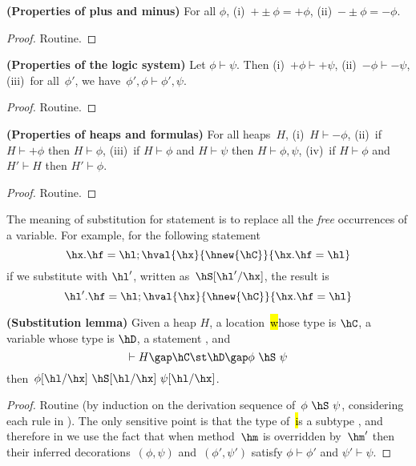 \begin{lemma}  \textbf{(Properties of plus and minus)}
\label{Lemma:plus}
For all $\phi$,
    (i)~$+\pm\phi=+\phi$,
    (ii)~$-\pm\phi=-\phi$.
\end{lemma}
\begin{proof}
Routine.
\end{proof}



\begin{lemma}   \textbf{(Properties of the logic system)}
\label{Lemma:logic}
Let $\phi \vdash \psi$.
Then
    (i)~$+\phi \vdash +\psi$,
    (ii)~$-\phi \vdash -\psi$,
    (iii)~for all~$\phi'$, we have~$\phi',\phi \vdash \phi',\psi$.
\end{lemma}
\begin{proof}
Routine.
\end{proof}



\begin{lemma}   \textbf{(Properties of heaps and formulas)}
\label{Lemma:heaps}
For all heaps~$H$,
(i)~$H \vdash -\phi$,
(ii)~if $H \vdash +\phi$ then $H \vdash \phi$,
(iii)~if $H \vdash \phi$ and $H \vdash \psi$ then $H \vdash \phi,\psi$,
(iv)~if $H \vdash \phi$ and~$H' \vdash H$ then $H' \vdash \phi$.
\end{lemma}
\begin{proof}
Routine.
\end{proof}


The meaning of substitution for statement is to replace all the \emph{free} occurrences of a variable.
For example, for the following statement~\hS \[
\hx.\hf=\hl;\hval{\hx}{\hnew{\hC}}{\hx.\hf=\hl}
\]
if we substitute \hx with $\hl'$, written as~$\hS[\hl'/\hx]$, the result is \[
\hl'.\hf=\hl;\hval{\hx}{\hnew{\hC}}{\hx.\hf=\hl}
\]


\begin{lemma}  \textbf{(Substitution lemma)}
\label{Lemma:substitution}
Given a heap $H$, a location~\hl whose type is $\hC$, a variable \hx whose type is $\hD$, a statement \hS,
    and \[
    \vdash H \gap \hC \st \hD \gap \phi~\hS~\psi
    \] then~$\phi[\hl/\hx]~\hS[\hl/\hx]~\psi[\hl/\hx]$.
\end{lemma}
\begin{proof}
Routine (by induction on the derivation sequence of~$\phi~\hS~\psi$, considering each rule in ).
The only sensitive point is that the type of~\hl is a subtype \hx, and therefore in  we use the fact that when method~$\hm$ is overridden by~$\hm'$
    then their inferred decorations~$(\phi, \psi)$ and~$(\phi', \psi')$ satisfy $\phi \vdash \phi'$ and $\psi' \vdash \psi$.
\end{proof}



